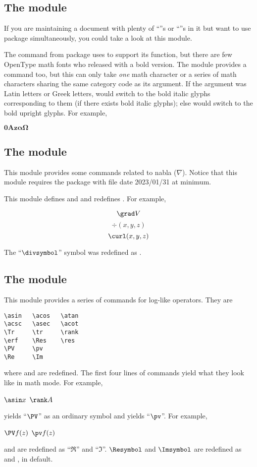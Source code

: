\documentclass[11pt,letterpaper]{article}
\begin{document}
\subsection{The  module}
If you are maintaining a document with plenty of ``''s or
``''s in it but want to use  package
simultaneously, you could take a look at this module.

The  command from  package uses  to support
its function, but there are few OpenType math fonts who released with a bold
version. The  module provides a  command too, but
this  can only take \emph{one} math character or a series of math
characters sharing the same category code as its argument.
If the argument was Latin letters or Greek letters,  would switch to
the bold italic glyphs corresponding to them (if there exists bold italic
glyphs); else  would switch to the bold upright glyphs. For example,
\begin{example}
$\bm{0}\bm{A}\bm{z}
 \bm{\alpha}\bm{\Omega}$
\end{example}

\subsection{The  module}
This module provides some commands related to nabla ($\nabla$). Notice that
this module requires the  package with file date 2023/01/31 at
minimum.

This module defines  and  and redefines . For example,
\begin{example}
\[ \grad V      \]
\[ \div (x,y,z) \]
\[ \curl(x,y,z) \]
\end{example}
The ``$\divsymbol$'' symbol was redefined as .

\subsection{The  module}
This module provides a series of commands for log-like operators. They are
\begin{Verbatim}
\asin   \acos   \atan
\acsc   \asec   \acot
\Tr     \tr     \rank
\erf    \Res    \res
\PV     \pv
\Re     \Im
\end{Verbatim}
where  and  are redefined. The first four lines of commands
yield what they look like in math mode. For example,
\begin{example}
$\asin x$ \quad $\rank A$
\end{example}
 yields ``$\PV$'' as an ordinary symbol and  yields ``$\pv$''.
For example,
\begin{example}
$\PV f(z)$ \quad $\pv f(z)$
\end{example}
 and  are redefined as ``$\Re$'' and ``$\Im$''. $\Resymbol$
and $\Imsymbol$ are redefined as  and , in default.
\end{document}
